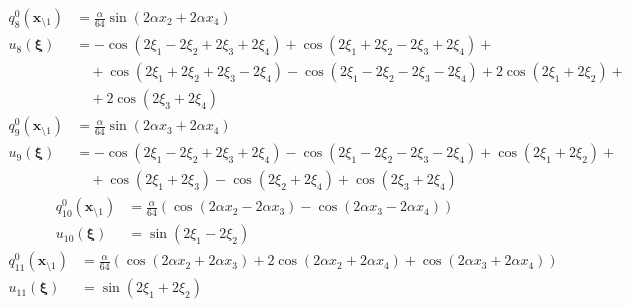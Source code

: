 \documentclass[11pt]{jfm}
\numberwithin{equation}{section}
\begin{document}
\begin{subequations}
\label{A11}
\begin{align}
q_8^0(\boldsymbol{x}_{\setminus 1})&=\frac{\alpha}{64}   \sin (2 \alpha  x_2+2 \alpha  x_4) \label{A11a} \\
u_8(\boldsymbol{\xi})&=-\cos (2 \xi_1-2 \xi_2+2 \xi_3+2 \xi_4)+\cos (2 \xi_1+2 \xi_2-2 \xi_3+2 \xi_4)+ \nonumber\\
&\quad+\cos (2 \xi_1+2 \xi_2+2 \xi_3-2 \xi_4)\!-\!\cos (2 \xi_1-2 \xi_2-2 \xi_3-2 \xi_4)\!+\!2 \cos (2 \xi_1+2 \xi_2)+ \nonumber\\
&\quad+2 \cos (2 \xi_3+2 \xi_4)
\label{A11b}
\end{align}\end{subequations}
\vspace{-0.4cm}
\begin{subequations}
\label{A12}
\begin{align}
q_9^0(\boldsymbol{x}_{\setminus 1})&=\frac{\alpha}{64}   \sin (2 \alpha  x_3+2 \alpha  x_4)\label{A12a} \\
u_9(\boldsymbol{\xi})&=-\cos (2 \xi_1-2 \xi_2+2 \xi_3+2 \xi_4)-\cos (2 \xi_1-2 \xi_2-2 \xi_3-2 \xi_4)\!+\cos (2 \xi_1+2 \xi_2)+ \nonumber\\
&\quad+\cos (2 \xi_1+2 \xi_3)-\cos (2 \xi_2+2 \xi_4)+\cos (2 \xi_3+2 \xi_4)
\label{A12b}
\end{align}\end{subequations}
\vspace{-0.4cm}
\begin{subequations}
\label{A13}
\begin{align}
q_{10}^0(\boldsymbol{x}_{\setminus 1})&=\frac{\alpha}{64}   (\cos (2 \alpha  x_2-2 \alpha  x_3)-\cos (2 \alpha  x_3-2 \alpha  x_4))\label{A13a} \\
u_{10}(\boldsymbol{\xi})&=\sin (2 \xi_1-2 \xi_2)
\label{A13b}
\end{align}\end{subequations}
\vspace{-0.4cm}
\begin{subequations}
\label{A14}
\begin{align}
q_{11}^0(\boldsymbol{x}_{\setminus 1})&=\frac{\alpha}{64}   (\cos (2 \alpha  x_2+2 \alpha  x_3)+2 \cos (2 \alpha  x_2+2 \alpha  x_4)+\cos (2 \alpha  x_3+2 \alpha  x_4))
\label{A14a} \\
u_{11}(\boldsymbol{\xi})&=\sin (2 \xi_1+2 \xi_2)
\label{A14b}
\end{align}\end{subequations}
\vspace{-0.4cm}
\end{document}

